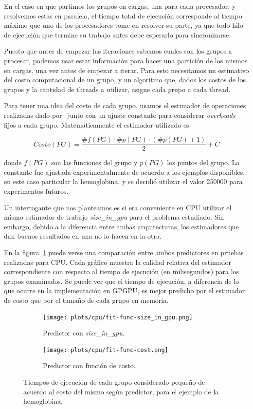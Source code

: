 En el caso en que partimos los grupos en cargas, una para cada procesador, y
resolvemos estas en paralelo, el tiempo total de ejecuci\'on corresponde al tiempo m\'aximo
que uno de los procesadores tome en resolver su parte, ya que todo hilo de
ejecuci\'on que termine su trabajo antes debe esperarlo para sincronizarse.

Puesto que antes de empezar las iteraciones sabemos cuales son los grupos a
procesar, podemos usar estar informaci\'on para hacer una partici\'on de los mismos
en cargas, una vez antes de empezar a iterar. Para esto necesitamos un estimativo del costo
computacional de un grupo, y un algoritmo que, dados los costos de los grupos y la cantidad de threads a
utilizar, asigne cada grupo a cada thread.

Para tener una idea del costo de cada grupo, usamos el estimador de operaciones realizadas
dado por~\cite{LIO} junto con un ajuste constante para considerar \textit{overheads} fijos a
cada grupo. Matem\'aticamente el estimador utilizado es:

\begin{equation}
    Costo(PG) = \frac{\#f(PG) \cdot \#p(PG) \cdot (\#p(PG) + 1)}{2} + C
\end{equation}

donde $f(PG)$ son las funciones del grupo y $p(PG)$ los puntos del grupo. La
constante fue ajustada experimentalmente de acuerdo a los ejemplos disponibles,
en este caso particular la hemoglobina, y se decidi\'o utilizar el valor 250000
para experimentos futuros.

Un interrogante que nos planteamos es si era conveniente en CPU utilizar el mismo
estimador de trabajo \textit{size\_in\_gpu} para el problema estudiado. Sin
embargo, debido a la diferencia entre ambas arquitecturas, los estimadores que
dan buenos resultados en una no lo hacen en la otra.

En la figura~\ref{fig:comp-size-cost} puede verse una comparaci\'on entre ambos
predictores en pruebas realizadas para CPU. Cada gr\'afico muestra la calidad
relativa del estimador correspondiente con respecto al tiempo de ejecuci\'on
(en milisegundos) para los grupos examinados. Se puede ver que el tiempo de
ejecuci\'on, a diferencia de lo que ocurre en la implementaci\'on en GPGPU, es
mejor predicho por el estimador de costo que por el tama\~no de cada grupo en
memoria.

\begin{figure}[htbp]
   \centering
   \begin{subfigure}[b]{\plotwidthtres}
     \texttt{[image: plots/cpu/fit-func-size\_in\_gpu.png]}
     \caption{Predictor con \textit{size\_in\_gpu}.}
   \end{subfigure}
   \begin{subfigure}[b]{\plotwidthtres}
     \texttt{[image: plots/cpu/fit-func-cost.png]}
     \caption{Predictor con funci\'on de costo.}
   \end{subfigure}
   \caption{Tiempos de ejecuci\'on de cada grupo considerado peque\~no de acuerdo
    al costo del mismo seg\'un predictor, para el ejemplo de la hemoglobina.}
   \label{fig:comp-size-cost}
\end{figure}

